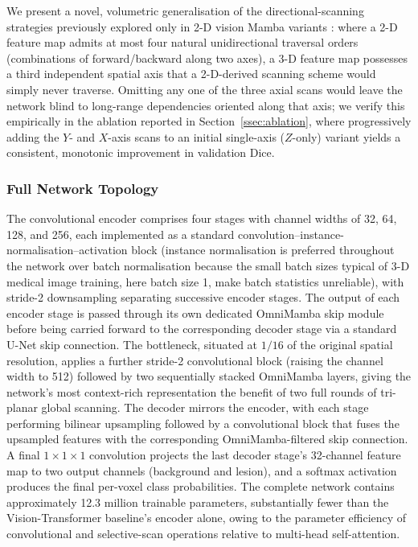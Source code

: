 \documentclass[pdflatex,sn-mathphys-num]{sn-jnl}
\begin{document}
We present a novel, volumetric generalisation of the
directional-scanning strategies previously explored only in 2-D vision
Mamba variants
\citep{liu2024vmamba,zhu2024vision}: where a 2-D feature map admits at
most four natural unidirectional traversal orders (combinations of
forward/backward along two axes), a 3-D feature map possesses a third
independent spatial axis that a 2-D-derived scanning scheme would
simply never traverse. Omitting any one of the three axial scans would
leave the network blind to long-range dependencies oriented along that
axis; we verify this empirically in the ablation reported in
Section~\ref{ssec:ablation}, where progressively adding the $Y$- and
$X$-axis scans to an initial single-axis ($Z$-only) variant yields
a consistent, monotonic improvement in validation Dice.

\subsubsection{Full Network Topology}\label{ssec:full_topology}
The convolutional encoder comprises four stages with channel widths of
32, 64, 128, and 256, each implemented as a standard
convolution--instance-normalisation--activation block
(instance normalisation is preferred throughout the network over batch
normalisation because the small batch sizes typical of 3-D medical
image training, here batch size 1, make batch statistics unreliable),
with stride-2 downsampling separating successive encoder stages. The
output of each encoder stage is passed through its own dedicated
OmniMamba skip module before being carried forward to the
corresponding decoder stage via a standard U-Net skip connection. The
bottleneck, situated at $1/16$ of the original spatial resolution,
applies a further stride-2 convolutional block (raising the channel
width to 512) followed by two sequentially stacked OmniMamba layers,
giving the network's most context-rich representation the benefit of
two full rounds of tri-planar global scanning. The decoder mirrors the
encoder, with each stage performing bilinear upsampling followed by a
convolutional block that fuses the upsampled features with the
corresponding OmniMamba-filtered skip connection. A final
$1\!\times\!1\!\times\!1$ convolution projects the last decoder
stage's 32-channel feature map to two output channels (background and
lesion), and a softmax activation produces the final per-voxel class
probabilities. The complete network contains approximately 12.3
million trainable parameters, substantially fewer than the
Vision-Transformer baseline's encoder alone, owing to the parameter
efficiency of convolutional and selective-scan operations relative to
multi-head self-attention.
\end{document}
